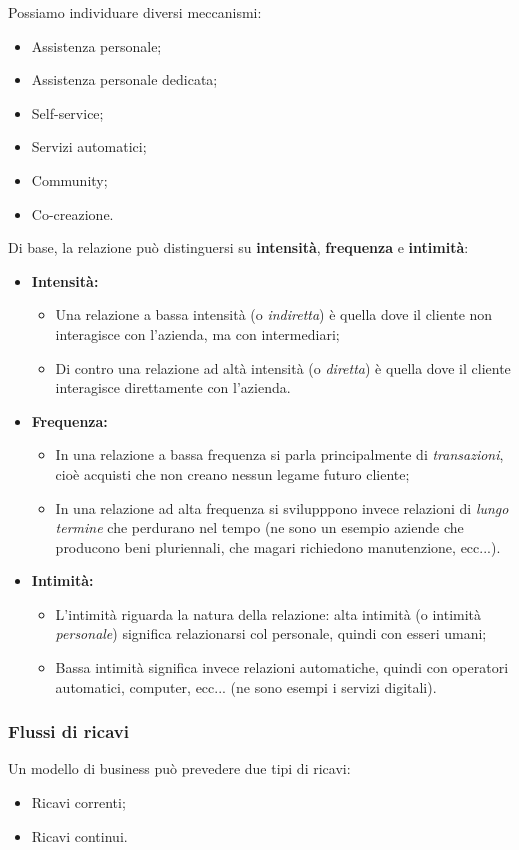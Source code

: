 \documentclass[a4paper,11pt]{article}
\begin{document}
Possiamo individuare diversi meccanismi:
\begin{itemize}
	\item Assistenza personale;
	\item Assistenza personale dedicata;
	\item Self-service;
	\item Servizi automatici;
	\item Community;
	\item Co-creazione.
\end{itemize}

Di base, la relazione può distinguersi su \textbf{intensità}, \textbf{frequenza} e \textbf{intimità}:
\begin{itemize}
	\item \textbf{Intensità:}
		\begin{itemize}
			\item Una relazione a bassa intensità (o \textit{indiretta}) è quella dove il cliente non interagisce con l'azienda, ma con intermediari;
			\item Di contro una relazione ad altà intensità (o \textit{diretta}) è quella dove il cliente interagisce direttamente con l'azienda.
		\end{itemize}
	\item \textbf{Frequenza:}
		\begin{itemize}
			\item In una relazione a bassa frequenza si parla principalmente di \textit{transazioni}, cioè acquisti che non creano nessun legame futuro cliente;
			\item In una relazione ad alta frequenza si svilupppono invece relazioni di \textit{lungo termine} che perdurano nel tempo (ne sono un esempio aziende che producono beni pluriennali, che magari richiedono manutenzione, ecc...).
		\end{itemize}
	\item \textbf{Intimità:}
		\begin{itemize}
			\item L'intimità riguarda la natura della relazione: alta intimità (o intimità \textit{personale}) significa relazionarsi col personale, quindi con esseri umani;
			\item Bassa intimità significa invece relazioni automatiche, quindi con operatori automatici, computer, ecc... (ne sono esempi i servizi digitali).
		\end{itemize}
\end{itemize}

\subsubsection{Flussi di ricavi}
Un modello di business può prevedere due tipi di ricavi:
\begin{itemize}
	\item Ricavi correnti;
	\item Ricavi continui.
\end{itemize}
\end{document}

